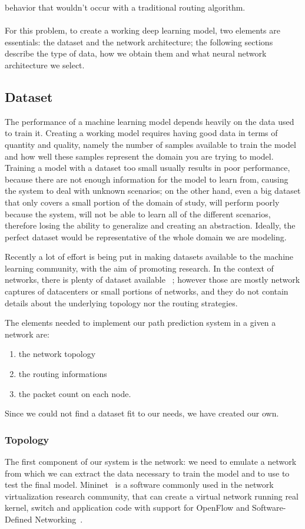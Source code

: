 behavior that wouldn't occur with a traditional routing algorithm. \\~\\For this problem, to create a working deep learning model, two elements are essentials: the dataset and the network architecture; the following sections describe the type of data, how we obtain them and what neural network architecture we select. 

\subsection{Dataset}
The performance of a machine learning model depends heavily on the data used to train it. Creating a working model requires having good data in terms of quantity and quality, namely the number of samples available to train the model and how well these samples represent the domain you are trying to model. Training a model with a dataset too small usually results in poor performance, because there are not enough information for the model to learn from, causing the system to deal with unknown scenarios; on the other hand, even a big dataset that only covers a small portion of the domain of study, will perform poorly because the system, will not be able to learn all of the different scenarios, therefore losing the ability to generalize and creating an abstraction. Ideally, the perfect dataset would be representative of the whole domain we are modeling.

Recently a lot of effort is being put in making datasets available to the machine learning community, with the aim of promoting research. In the context of networks, there is plenty of dataset available ~\cite{caida}\cite{fb_dataset}\cite{topo_zoo}; however those are mostly network captures of datacenters or small portions of networks, and they do not contain  details about the underlying topology nor the routing strategies. 

The elements needed to implement our path prediction system in a given a network are:
\begin{enumerate}
\item the network topology
\item the routing informations
\item the packet count on each node.	
\end{enumerate}
Since we could not find a dataset fit to our needs, we have created our own.

\subsubsection{Topology}
\label{sec:net_topology}
The first component of our system is the network: we need to emulate a network from which we can extract the data necessary to train the model and to use to test the final model. Mininet~\cite{mininet} is a software commonly used in the network virtualization research community, that can create a virtual network running real kernel, switch and application code with support for OpenFlow and Software-Defined Networking~\cite{openflow}.

